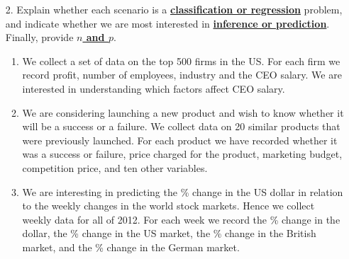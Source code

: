     \documentclass[12pt,fleqn,a4paper]{article}
\theoremstyle{definition}
\theoremstyle{plain}
\begin{document}
\begin{enumerate}
\item[2.] Explain whether each scenario is a \underline{\textbf{classification or regression}} problem,
and indicate whether we are most interested in \underline{\textbf{inference or prediction}}. Finally, provide \underline{\textbf{$n$ and $p$}}.
    \begin{enumerate}
        \item We collect a set of data on the top 500 firms in the US. For each firm we record profit, number of employees, industry and the CEO salary.
              We are interested in understanding which factors affect CEO salary.
        \item We are considering launching a new product and wish to know whether it will be a success or a failure.
              We collect data on 20 similar products that were previously launched.
              For each product we have recorded whether it was a success or failure, price charged for the product, marketing budget, competition price, and ten other variables.
        \item We are interesting in predicting the \% change in the US dollar in relation to the weekly changes in the world stock markets.
              Hence we collect weekly data for all of 2012. For each week we record the \% change in the dollar, the \% change in the US market, the \% change in the British market,
              and the \% change in the German market.
    \end{enumerate}
\end{enumerate}
\end{document}
